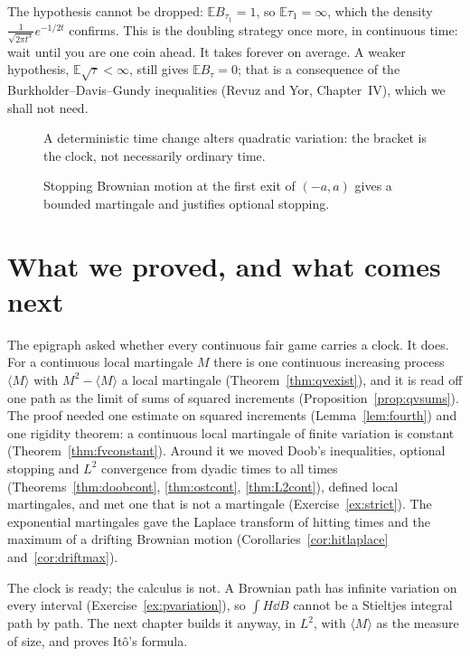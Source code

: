 \begin{remark}
The hypothesis cannot be dropped: $\mathbb EB_{\tau_1}=1$, so $\mathbb E\tau_1=\infty$, which the density $\frac1{\sqrt{2\pi t^3}}e^{-1/2t}$ confirms. This is the doubling strategy once more, in continuous time:
wait until you are one coin ahead. It takes forever on average. A weaker hypothesis, $\mathbb E\sqrt\tau<\infty$, still gives $\mathbb EB_\tau=0$; that is a consequence of the Burkholder--Davis--Gundy inequalities (Revuz and Yor, Chapter~IV),
which we shall not need.
\end{remark}

\begin{figure}[ht]
\centering
{}
\caption{A deterministic time change alters quadratic variation: the bracket is the clock, not necessarily ordinary time.}
\label{fig:v12bracketclock}
\end{figure}

\begin{figure}[ht]
\centering
{}
\caption{Stopping Brownian motion at the first exit of $(-a,a)$ gives a bounded martingale and justifies optional stopping.}
\label{fig:v12stopbound}
\end{figure}

\section{What we proved, and what comes next}

The epigraph asked whether every continuous fair game carries a clock. It does. For a continuous local martingale $M$ there is one continuous
increasing process $\langle M\rangle$ with $M^2-\langle M\rangle$ a local martingale (Theorem~\ref{thm:qvexist}), and it is read off one path as the limit of
sums of squared increments (Proposition~\ref{prop:qvsums}). The proof needed one estimate on squared increments (Lemma~\ref{lem:fourth}) and one rigidity
theorem: a continuous local martingale of finite variation is constant (Theorem~\ref{thm:fvconstant}). Around it we moved Doob's inequalities, optional
stopping and $L^2$ convergence from dyadic times to all times (Theorems~\ref{thm:doobcont}, \ref{thm:ostcont}, \ref{thm:L2cont}), defined local
martingales, and met one that is not a martingale (Exercise~\ref{ex:strict}). The exponential martingales gave the Laplace transform of hitting times
and the maximum of a drifting Brownian motion (Corollaries~\ref{cor:hitlaplace} and~\ref{cor:driftmax}).

The clock is ready; the calculus is not. A Brownian path has infinite variation on every interval (Exercise~\ref{ex:pvariation}), so $\int H\dd B$ cannot be
a Stieltjes integral path by path. The next chapter builds it anyway, in $L^2$, with $\langle M\rangle$ as the measure of size, and proves It\^o's formula.

